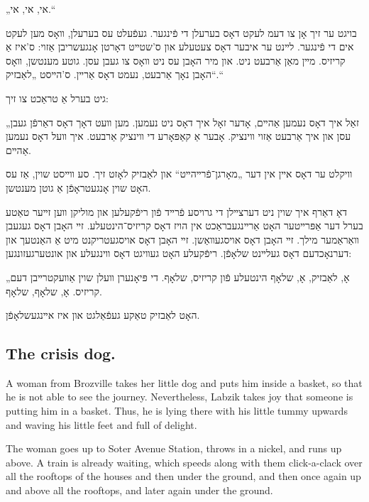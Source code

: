 \documentclass{memoir}
\begin{document}
\begin{pairs}
\begin{Rightside}
\begin{RTL}
\begin{hebrew}
„אי, אי, אי.“

בויגט ער זיך אָן צו דעמ לעקט דאָס בערעלן די פֿינגער. געפֿעלט
עס בערעלן, װאָס מען לעקט אים די פֿינגער. לײנט ער איבער דאָס
צעטעלע און ס'שטײט דאָרטן אָנגעשריבן אַזוי: ס'איז אַ קריזיס. מײן
מאַן אַרבעט ניט. און מיר האָבן עס ניט װאָס צו געבן עסן. גוטע
מענטשן, װאָס האָבן נאָך אַרבעט, נעמט דאָס אַרײן. ס'הײסט „לאַבזיק“.“

גיט בערל אַ טראַכט צו זיך:

„זאַל איך דאָס נעמען אַהײם, אָדער זאָל איך דאָס ניט נעמען.
מען װעט דאָך דאָס דאַרפֿן געבן עסן און איך אַרבעט אַזוי װינציק.
אָבער אַ קאַפּאָרע די װינציק אַרבעט. איך װעל דאָס נעמען אַהײם.

װיקלט ער דאָס אײן אין דער „מאָרגן־פֿרײהײט“ און לאַבזיק לאָזט
זיך. סע װײסט שוין, אַז עס האָט שוין אָנגעטראָפֿן אַ גוטן מענטשן.

דאָ דאַרף איך שוין ניט דערצײלן די גרויסע פֿרײד פֿון ריפֿקעלען
און מוליקן װען זײער טאַטע בערל דער אַפּרײטער האָט אַרײנגעבראַכט
אין הויז דאָס קריזיס־הינטעלע. זײ האָבן דאָס געגעבן װאַראַמער מילך.
זײ האָבן דאָס אויסגעװאַשן. זײ האָבן דאָס אויסגעטריקנט מיט אַ
האַנטעך און דערנאָכדעם דאָס געלײנט שלאָפֿן. ריפֿקעלע האָט געװיגט
דאָס װינגעלע און אונטערגעזונגען:

„אָ, לאַבזיק, אָ, שלאָף הינטעלע פֿון קריזיס, שלאָף. די פּיאָנערן
װעלן שוין אַװעקטרײבן דעם קריזיס. אָ, שלאָף, שלאָף.

האָט לאַבזיק טאַקע געפֿאַלגט און איז אײנגעשלאָפֿן. 

\endnumbering
\end{hebrew}
\end{RTL}
\end{Rightside}


\begin{Leftside}
\begin{english}
\chapter{
The crisis dog. \\    }
\newpage
\beginnumbering
\autopar

A woman from Brozville  takes her little dog and puts him inside a basket,
so that he is not able to see the journey. Nevertheless, Labzik takes joy that someone is putting him
in a basket. Thus, he is lying there with his little tummy upwards and waving his little feet and full of delight.

The woman goes up to Soter Avenue Station, throws in a nickel, and runs up above. A train is already waiting,
which speeds along with them click-a-clack over all the rooftops of the houses and then under the ground,
and then once again up and above all the rooftops, and later again under the ground.


\end{english}
\end{Leftside}
\end{pairs}
\end{document}
